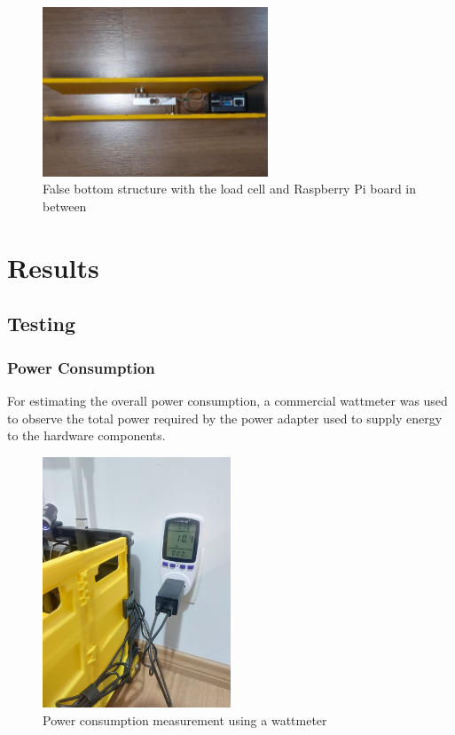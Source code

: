 \documentclass[openright]{normas-utf-tex} %
\begin{document}
\begin{figure}[H]
	\centering
	\includegraphics[width=0.6\textwidth]{./images/cartbase2.jpeg}
	\caption[False bottom structure with the load cell and Raspberry Pi board in between]{False bottom structure with the load cell and Raspberry Pi board in between}
\end{figure}

\chapter{Results}

\section{Testing}

\subsection{Power Consumption}

For estimating the overall power consumption, a commercial wattmeter was used
to observe the total power required by the power adapter used to supply energy
to the hardware components.

\begin{figure}[H]
	\centering
	\includegraphics[width=0.5\textwidth]{./images/powerconsumption.jpeg}
	\caption[Power consumption measurement using a wattmeter]{Power consumption measurement using a wattmeter}
\end{figure}
\end{document}
